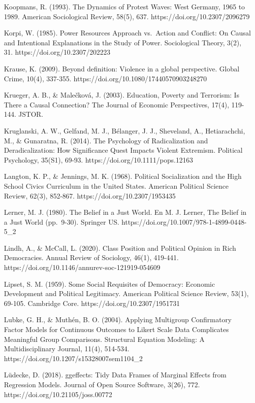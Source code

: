 \documentclass[
  13pt,
]{article}
\begin{document}
Koopmans, R. (1993). The Dynamics of Protest Waves: West Germany, 1965
to 1989. American Sociological Review, 58(5), 637.
https://doi.org/10.2307/2096279

Korpi, W. (1985). Power Resources Approach vs.~Action and Conflict: On
Causal and Intentional Explanations in the Study of Power. Sociological
Theory, 3(2), 31. https://doi.org/10.2307/202223

Krause, K. (2009). Beyond definition: Violence in a global perspective.
Global Crime, 10(4), 337-355. https://doi.org/10.1080/17440570903248270

Krueger, A. B., \& Malečková, J. (2003). Education, Poverty and
Terrorism: Is There a Causal Connection? The Journal of Economic
Perspectives, 17(4), 119-144. JSTOR.

Kruglanski, A. W., Gelfand, M. J., Bélanger, J. J., Sheveland, A.,
Hetiarachchi, M., \& Gunaratna, R. (2014). The Psychology of
Radicalization and Deradicalization: How Significance Quest Impacts
Violent Extremism. Political Psychology, 35(S1), 69-93.
https://doi.org/10.1111/pops.12163

Langton, K. P., \& Jennings, M. K. (1968). Political Socialization and
the High School Civics Curriculum in the United States. American
Political Science Review, 62(3), 852-867.
https://doi.org/10.2307/1953435

Lerner, M. J. (1980). The Belief in a Just World. En M. J. Lerner, The
Belief in a Just World (pp.~9-30). Springer US.
https://doi.org/10.1007/978-1-4899-0448-5\_2

Lindh, A., \& McCall, L. (2020). Class Position and Political Opinion in
Rich Democracies. Annual Review of Sociology, 46(1), 419-441.
https://doi.org/10.1146/annurev-soc-121919-054609

Lipset, S. M. (1959). Some Social Requisites of Democracy: Economic
Development and Political Legitimacy. American Political Science Review,
53(1), 69-105. Cambridge Core. https://doi.org/10.2307/1951731

Lubke, G. H., \& Muthén, B. O. (2004). Applying Multigroup Confirmatory
Factor Models for Continuous Outcomes to Likert Scale Data Complicates
Meaningful Group Comparisons. Structural Equation Modeling: A
Multidisciplinary Journal, 11(4), 514-534.
https://doi.org/10.1207/s15328007sem1104\_2

Lüdecke, D. (2018). ggeffects: Tidy Data Frames of Marginal Effects from
Regression Models. Journal of Open Source Software, 3(26), 772.
https://doi.org/10.21105/joss.00772
\end{document}

